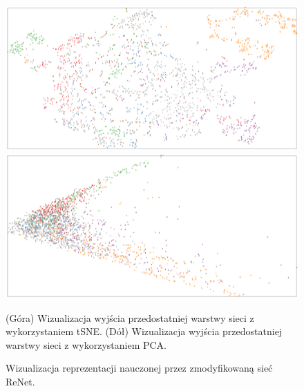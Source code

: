 \documentclass[oneside, mag]{mgr}
\begin{document}
\begin{figure}
\centering
	\includegraphics[width=1.0\textwidth]{img/tSNE_modif_ReNet.png}
	\includegraphics[width=1.0\textwidth]{img/PCA_modif_ReNet.png}
	\caption{Wizualizacja reprezentacji nauczonej przez zmodyfikowaną sieć ReNet.} (Góra) Wizualizacja wyjścia przedostatniej warstwy sieci z wykorzystaniem tSNE. (Dół) Wizualizacja wyjścia przedostatniej warstwy sieci z wykorzystaniem PCA.
	\label{fig:tSNE_modif_ReNet}
\end{figure}
\end{document}
